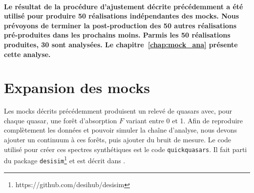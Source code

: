 \paragraph{}
\textbf{Le résultat de la procédure d'ajustement décrite précédemment a été utilisé pour produire \num{50} réalisations indépendantes des mocks. Nous prévoyons de terminer la post-production des \num{50} autres réalisations pré-produites dans les prochains moins.
  Parmis les \num{50} réalisations produites, \num{30} sont analysées. Le chapitre~\ref{chap:mock_ana} présente cette analyse.}


\section{Expansion des mocks}
\label{sec:quickquasars}

Les mocks décrits précédemment produisent un relevé de quasars avec, pour chaque quasar, une forêt d'absorption $F$ variant entre 0 et 1.
Afin de reproduire complètement les données et pouvoir simuler la chaîne d'analyse, nous devons ajouter un continuum à ces forêts, puis ajouter du bruit de mesure.
Le code utilisé pour créer ces spectres synthétiques est le code \texttt{quickquasars}. Il fait parti du package \texttt{desisim}\footnote{https://github.com/desihub/desisim} et est décrit dans \textcite{Gonzalez-Morales}. 

